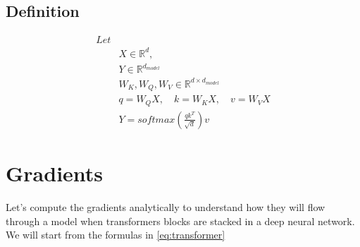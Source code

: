 \documentclass{report}
\begin{document}
    \subsection{Definition}
    \begin{align*}
        Let &                                                                    \\
            & X \in \mathbb{R}^d,                                                \\
            & Y \in \mathbb{R}^{d_{model}}                                       \\
            & W_K, W_Q, W_V \in \mathbb{R}^{d \times d_{model}}                  \\
            & q = W_Q X, \quad k = W_K X, \quad v = W_V X                        \\
            & Y = softmax(\frac{qk^T}{\sqrt{d}})v \label{eq:transformer} \tag{1}
    \end{align*}


    \section{Gradients}
    Let's compute the gradients analytically to understand how they will flow through a model when
    transformers blocks are stacked in a deep neural network.
    We will start from the formulas in \eqref{eq:transformer}



\end{document}
